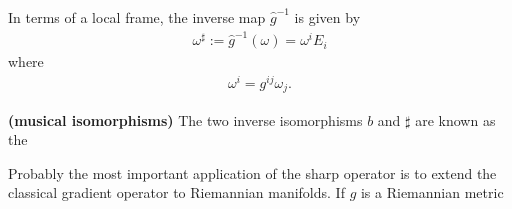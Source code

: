 \documentclass[12pt]{article} %
\newcommand{\bfs}[1]{\textbf{({#1}) }}
\begin{document}

In terms of a local frame, the inverse map $\widehat{g}^{-1}$ is given by
\begin{align*}
\omega^{\sharp}:=\widehat{g}^{-1}(\omega)=\omega^{i} E_{i}
\end{align*}
where
\begin{align*}
\omega^{i}=g^{i j} \omega_{j} .
\end{align*}

\begin{defa}\bfs{musical isomorphisms}
The two inverse isomorphisms $b$ and $\sharp$ are known as the 
\end{defa}

Probably the most important application of the sharp operator is to extend the classical gradient operator to Riemannian manifolds. If $g$ is a Riemannian metric
\end{document}
